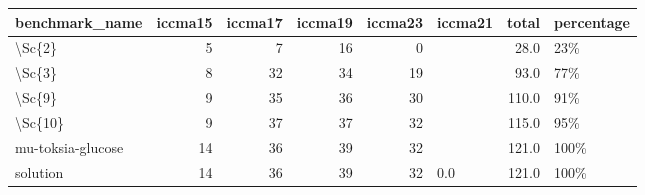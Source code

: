 \begin{tabular}{lrrrrlrl}
\toprule
benchmark\_name &  iccma15 &  iccma17 &  iccma19 &  iccma23 & iccma21 &  total & percentage \\
\midrule
\textbackslash Sc\{2\}            &        5 &        7 &       16 &        0 &         &   28.0 &        23\% \\
\textbackslash Sc\{3\}            &        8 &       32 &       34 &       19 &         &   93.0 &        77\% \\
\textbackslash Sc\{9\}            &        9 &       35 &       36 &       30 &         &  110.0 &        91\% \\
\textbackslash Sc\{10\}           &        9 &       37 &       37 &       32 &         &  115.0 &        95\% \\
mu-toksia-glucose &       14 &       36 &       39 &       32 &         &  121.0 &       100\% \\
solution          &       14 &       36 &       39 &       32 &     0.0 &  121.0 &       100\% \\
\bottomrule
\end{tabular}
